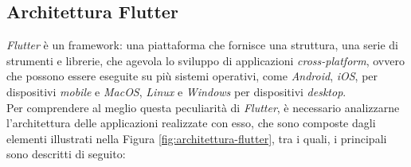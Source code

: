 \subsection{Architettura Flutter}
\label{subsec:architettura-flutter}

\emph{Flutter} è un \gls{framework}\glsoccur: una piattaforma che fornisce una struttura, una serie di strumenti e librerie, che agevola lo sviluppo di applicazioni \emph{cross-platform}, ovvero che possono essere eseguite su più sistemi operativi, come \emph{Android}, \emph{iOS}, per dispositivi \emph{mobile} e \emph{MacOS}, \emph{Linux} e \emph{Windows} per dispositivi \emph{desktop}.\\
Per comprendere al meglio questa peculiarità di \emph{Flutter}, è necessario analizzarne l'architettura \cite{site:flutter-architecture} delle applicazioni realizzate con esso, che sono composte dagli elementi illustrati nella Figura \ref{fig:architettura-flutter}, tra i quali, i principali sono descritti di seguito:
